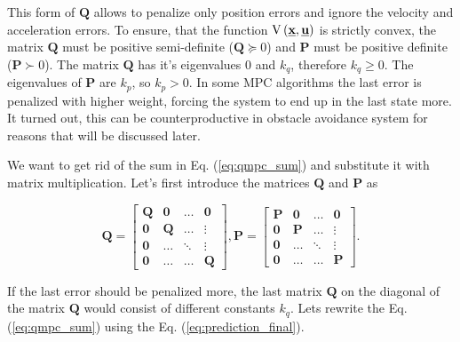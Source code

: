 \documentclass[a4paper,11pt,titlepage]{article}
\newcommand{\uvec}{\textbf{\underline{u}}}
\begin{document}
This form of $\textbf{Q}$ allows to penalize only position errors and ignore the velocity and acceleration errors. To ensure, that the function $\mathrm{V}\left(\textbf{\underline{x}}, \uvec\right)$ is strictly convex, the matrix $\textbf{Q}$ must be positive semi-definite ($\textbf{Q} \succeq 0$) and $\textbf{P}$ must be positive definite ($\textbf{P} \succ 0$). The matrix $\textbf{Q}$ has it's eigenvalues $0$ and $k_q$, therefore $k_q \geq 0$. The eigenvalues of $\textbf{P}$ are $k_p$, so $k_p > 0$. In some MPC algorithms the last error is penalized with higher weight, forcing the system to end up in the last state more. It turned out, this can be counterproductive in obstacle avoidance system for reasons that will be discussed later.

We want to get rid of the sum in Eq. (\ref{eq:qmpc_sum}) and substitute it with matrix multiplication. Let's first introduce the matrices $\textbf{\^Q}$ and $\textbf{\^P}$ as 

\begin{equation}
\label{eq:qmpc_weighting_matrices}
\textbf{\^Q} = \begin{bmatrix}
\textbf{Q} & \textbf{0} & \hdots & \textbf{0} \\
\textbf{0} & \textbf{Q} & \hdots & \vdots \\
\textbf{0} & \hdots & \ddots & \vdots \\
\textbf{0} & \hdots & \hdots & \textbf{Q}
\end{bmatrix},
\textbf{\^P} = \begin{bmatrix}
\textbf{P} & \textbf{0} & \hdots & \textbf{0} \\
\textbf{0} & \textbf{P} & \hdots & \vdots \\
\textbf{0} & \hdots & \ddots & \vdots \\
\textbf{0} & \hdots & \hdots & \textbf{P}
\end{bmatrix}.
\end{equation}

If the last error should be penalized more, the last matrix $\textbf{Q}$ on the diagonal of the matrix $\textbf{\^Q}$ would consist of different constants $k_q$. Lets rewrite the Eq. (\ref{eq:qmpc_sum}) using the Eq. (\ref{eq:prediction_final}).
\end{document}
